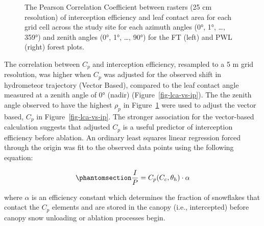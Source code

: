 \documentclass[
  letterpaper,
  DIV=11,
  numbers=noendperiod]{scrartcl}
\begin{document}
\begin{figure}


\caption{\label{fig-hemi-ip-cc}The Pearson Correlation Coefficient
between rasters (25 cm resolution) of interception efficiency and leaf
contact area for each grid cell across the study site for each azimuth
angles (0°, 1°, \ldots, 359°) and zenith angles (0°, 1°, \ldots, 90°)
for the FT (left) and PWL (right) forest plots.}

\end{figure}%

The correlation between \(C_p\) and interception efficiency, resampled
to a 5 m grid resolution, was higher when \(C_p\) was adjusted for the
observed shift in hydrometeor trajectory (Vector Based), compared to the
leaf contact angle measured at a zenith angle of 0° (nadir)
(Figure~\ref{fig-lca-vs-ip}). The the zenith angle observed to have the
highest \(\rho_p\) in Figure~\ref{fig-hemi-ip-cc} were used to adjust
the vector based, \(C_p\) in Figure~\ref{fig-lca-vs-ip}. The stronger
association for the vector-based calculation suggests that adjusted
\(C_p\) is a useful predictor of interception efficiency before
ablation. An ordinary least squares linear regression forced through the
origin was fit to the observed data points using the following equation:

\begin{equation}\phantomsection\label{eq-lca-ip}{
  \frac{I}{P} = C_p(C_c, \theta_h) \cdot \alpha
}\end{equation}

where \(\alpha\) is an efficiency constant which determines the fraction
of snowflakes that contact the \(C_p\) elements and are stored in the
canopy (i.e., intercepted) before canopy snow unloading or ablation
processes begin.
\end{document}

